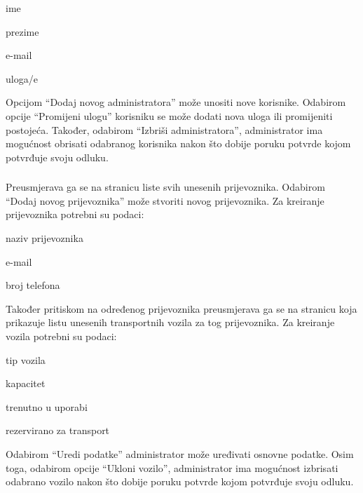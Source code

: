 		\begin{packed_item}
			\item ime
			\item prezime
			\item e-mail
			\item uloga/e
		\end{packed_item}
		
		\noindent Opcijom “Dodaj novog administratora” može unositi nove korisnike. Odabirom opcije “Promijeni ulogu” korisniku se može dodati nova uloga ili promijeniti postojeća. Također, odabirom “Izbriši administratora”, administrator ima mogućnost obrisati odabranog korisnika nakon što dobije poruku potvrde kojom potvrđuje svoju odluku. 
		
		\subsubsection{\noindent {}}
		
		Preusmjerava ga se na stranicu liste svih unesenih prijevoznika. Odabirom “Dodaj novog prijevoznika” može stvoriti novog prijevoznika. Za kreiranje prijevoznika potrebni su podaci: 
		
		\begin{packed_item}
			\item naziv prijevoznika 
			\item e-mail
			\item broj telefona
		\end{packed_item}
		
		\noindent Također pritiskom na određenog prijevoznika preusmjerava ga se na stranicu koja prikazuje listu unesenih transportnih vozila za tog prijevoznika. Za kreiranje vozila potrebni su podaci: 
		
		\begin{packed_item}
			\item tip vozila 
			\item kapacitet
			\item trenutno u uporabi 
			\item rezervirano za transport 
		\end{packed_item}
		
		 \noindent Odabirom “Uredi podatke” administrator može uređivati osnovne podatke. Osim toga, odabirom opcije “Ukloni vozilo”, administrator ima mogućnost izbrisati odabrano vozilo nakon što dobije poruku potvrde kojom potvrđuje svoju odluku. 
		
		\subsubsection{\noindent {}}
		
